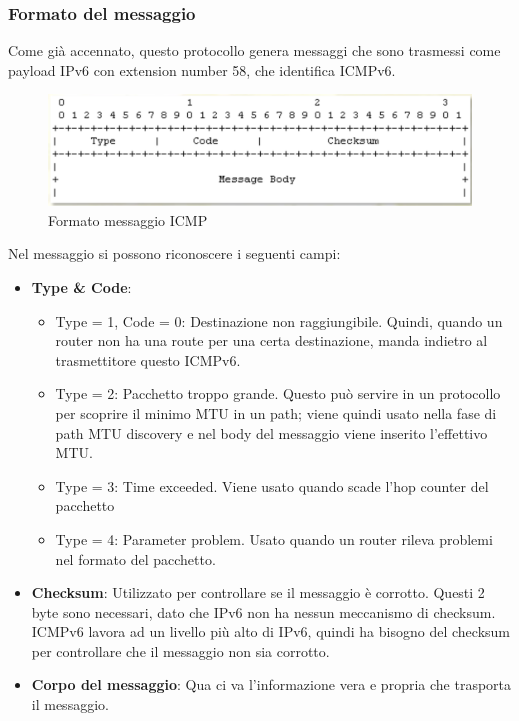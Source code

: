 \documentclass{article}
\begin{document}
\subsubsection{Formato del messaggio}
Come già accennato, questo protocollo genera messaggi che sono trasmessi come payload IPv6 con extension number 58, che identifica ICMPv6.
\begin{figure}[H]
\centering
\includegraphics[scale=0.4]{figures/ICMP format.png}
\caption{Formato messaggio ICMP}
\end{figure}
Nel messaggio si possono riconoscere i seguenti campi:
\begin{itemize}
    \item \textbf{Type \& Code}:
        \begin{itemize}
            \item Type = 1, Code = 0: Destinazione non raggiungibile. Quindi, quando un router non ha una route per una certa destinazione, manda indietro al trasmettitore questo ICMPv6.
            \item Type = 2: Pacchetto troppo grande. Questo può servire in un protocollo per scoprire il minimo MTU in un path; viene quindi usato nella fase di path MTU discovery e nel body del messaggio viene inserito l'effettivo MTU.
            \item Type = 3: Time exceeded. Viene usato quando scade l'hop counter del pacchetto
            \item Type = 4: Parameter problem. Usato quando un router rileva problemi nel formato del pacchetto.
        \end{itemize}{}
    \item \textbf{Checksum}: Utilizzato per controllare se il messaggio è corrotto. Questi 2 byte sono necessari, dato che IPv6 non ha nessun meccanismo di checksum. ICMPv6 lavora ad un livello più alto di IPv6, quindi ha bisogno del checksum per controllare che il messaggio non sia corrotto.
    \item \textbf{Corpo del messaggio}: Qua ci va l'informazione vera e propria che trasporta il messaggio. 
\end{itemize}
\end{document}
